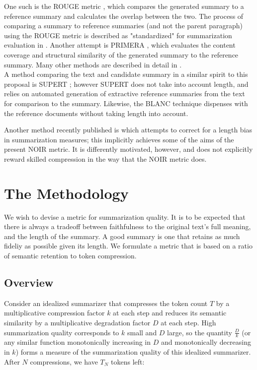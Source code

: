 \documentclass{article}
\begin{document}
One such is the ROUGE metric \citep{lin_rouge_2004}, which compares the generated summary to a reference summary and calculates the overlap between the two.
The process of comparing a summary to reference summaries (and not the parent paragraph) using the ROUGE metric is described as "standardized" for summarization evaluation in \citep{fabbri_summeval_2021}.
Another attempt is PRIMERA \citep{xiao_primera_2022}, which evaluates the content coverage and structural similarity of the generated summary to the reference summary.  
Many other methods are described in detail in \citep{fabbri_summeval_2021}.
\\
A method comparing the text and candidate summary in a similar spirit to this proposal is SUPERT \citep{supert}; however SUPERT does not take into account length, and relies on automated generation of extractive reference summaries from the text for comparison to the summary.  Likewise, the BLANC \citep{vasilyev-etal-2020-fill} technique dispenses with the reference documents without taking length into account.

Another method recently published is \citep{guo-vosoughi-2023-length} which attempts to correct for a length bias in summarization measures; this implicitly achieves some of the aims of the present NOIR metric.  It is differently motivated, however, and does not explicitly reward skilled compression in the way that the NOIR metric does.

\section{The Methodology}

We wish to devise a metric for summarization quality. 
It is to be expected that there is always a tradeoff between faithfulness to the original text's full meaning, and the length of the summary.
A good summary is one that retains as much fideliy as possible given its length.
We formulate a metric that is based on a ratio of semantic retention to token compression.

\subsection{Overview}
Consider an idealized summarizer that compresses the token count $T$ by a multiplicative compression factor $k$ at each step and reduces its semantic similarity by a multiplicative degradation factor $D$ at each step.  
High summarization quality corresponds to $k$ small and $D$ large, so the quantity $\frac{D}{k}$ (or any similar function monotonically increasing in $D$ and monotonically decreasing in $k$) forms a measure of the summarization quality of this idealized summarizer. After $N$ compressions, we have $T_N$ tokens left:
\end{document}
